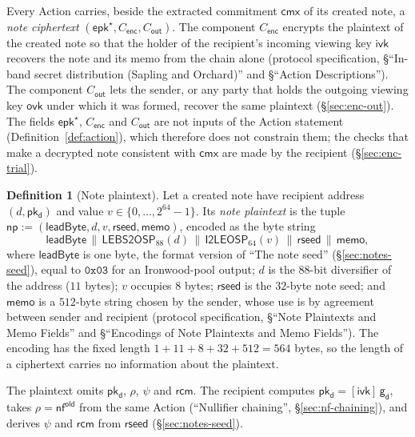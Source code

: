 \documentclass[11pt,a4paper]{article}
\theoremstyle{definition}
\newtheorem{definition}[theorem]{Definition}
\newcommand{\nfsym}{\mathsf{nf}}
\newcommand{\cmx}{\mathsf{cmx}}
\newcommand{\ivk}{\ensuremath{\mathsf{ivk}}}
\newcommand{\ovk}{\ensuremath{\mathsf{ovk}}}
\newcommand{\pkd}{\ensuremath{\mathsf{pk_d}}}
\newcommand{\gd}{\ensuremath{\mathsf{g_d}}}
\newcommand{\rcm}{\ensuremath{\mathsf{rcm}}}
\begin{document}
Every Action carries, beside the extracted commitment $\cmx$ of its created
note, a \emph{note ciphertext} $(\mathsf{epk}^{\star}, C_{\mathsf{enc}},
C_{\mathsf{out}})$. The component $C_{\mathsf{enc}}$ encrypts the plaintext of
the created note so that the holder of the recipient's incoming viewing key
$\ivk$ recovers the note and its memo from the chain alone (protocol
specification, \S``In-band secret distribution (Sapling and Orchard)'' and
\S``Action Descriptions''). The component $C_{\mathsf{out}}$ lets the sender,
or any party that holds the outgoing viewing key $\ovk$ under which it was
formed, recover the same plaintext (\S\ref{sec:enc-out}). The fields
$\mathsf{epk}^{\star}$, $C_{\mathsf{enc}}$ and $C_{\mathsf{out}}$ are not
inputs of the Action statement (Definition~\ref{def:action}), which therefore
does not constrain them; the checks that make a decrypted note consistent
with $\cmx$ are made by the recipient (\S\ref{sec:enc-trial}).

\begin{definition}[Note plaintext]
Let a created note have recipient address $(d, \pkd)$ and value
$v \in \{0, \dots, 2^{64} - 1\}$. Its \emph{note plaintext} is the tuple
$\mathsf{np} := (\mathsf{leadByte}, d, v, \mathsf{rseed}, \mathsf{memo})$,
encoded as the byte string
\[
  \mathsf{leadByte} \,\|\, \mathsf{LEBS2OSP}_{88}(d) \,\|\,
  \mathsf{I2LEOSP}_{64}(v) \,\|\, \mathsf{rseed} \,\|\, \mathsf{memo},
\]
where $\mathsf{leadByte}$ is one byte, the format version of ``The note
seed'' (\S\ref{sec:notes-seed}), equal to $\mathtt{0x03}$ for an
Ironwood-pool output; $d$ is the $88$-bit diversifier of the address
($11$ bytes); $v$ occupies $8$ bytes; $\mathsf{rseed}$ is the $32$-byte note
seed; and $\mathsf{memo}$ is a $512$-byte string chosen by the sender, whose
use is by agreement between sender and recipient (protocol specification,
\S``Note Plaintexts and Memo Fields'' and \S``Encodings of Note Plaintexts
and Memo Fields''). The encoding has the fixed length
$1 + 11 + 8 + 32 + 512 = 564$ bytes, so the length of a ciphertext carries
no information about the plaintext.
\end{definition}

The plaintext omits $\pkd$, $\rho$, $\psi$ and $\rcm$. The recipient
computes $\pkd = [\ivk]\,\gd$, takes $\rho = \nfsym^{\mathsf{old}}$ from the
same Action (``Nullifier chaining'', \S\ref{sec:nf-chaining}), and derives
$\psi$ and $\rcm$ from $\mathsf{rseed}$ (\S\ref{sec:notes-seed}).
\end{document}
